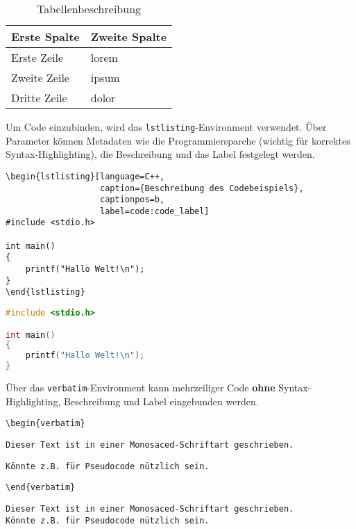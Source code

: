 {\renewcommand{\arraystretch}{1.5}
\begin{table}[h!]
\centering
\begin{tabular}{ l|l } 
\hline
    \textbf{Erste Spalte} & \textbf{Zweite Spalte} \\
\hline
Erste Zeile & lorem \\
Zweite Zeile & ipsum \\
Dritte Zeile & dolor \\
\hline
\end{tabular}
\caption{Tabellenbeschreibung}
\label{table:label_der_tabelle}
\end{table}}


Um Code einzubinden, wird das \verb|lstlisting|-Environment verwendet.
Über Parameter können Metadaten wie die Programmiersparche (wichtig für korrektes Syntax-Highlighting), die Beschreibung und das Label festgelegt werden.

\begin{verbatim}
\begin{lstlisting}[language=C++,
                   caption={Beschreibung des Codebeispiels},
                   captionpos=b,
                   label=code:code_label]
#include <stdio.h>

int main()
{
    printf("Hallo Welt!\n");
}
\end{lstlisting}
\end{verbatim}

\begin{lstlisting}[language=C++,
                   caption={Beschreibung des Codebeispiels},
                   captionpos=b,
                   label=code:code_label]
#include <stdio.h>

int main()
{
    printf("Hallo Welt!\n");
}
\end{lstlisting}

Über das \verb|verbatim|-Environment kann mehrzeiliger Code \textbf{ohne} Syntax-Highlighting, Beschreibung und Label eingebunden werden.

\verb|\begin{verbatim}|

\verb|Dieser Text ist in einer Monosaced-Schriftart geschrieben.|

\verb|Könnte z.B. für Pseudocode nützlich sein.|

\verb|\end{verbatim}|

\begin{verbatim}
Dieser Text ist in einer Monosaced-Schriftart geschrieben.
Könnte z.B. für Pseudocode nützlich sein.
\end{verbatim}

